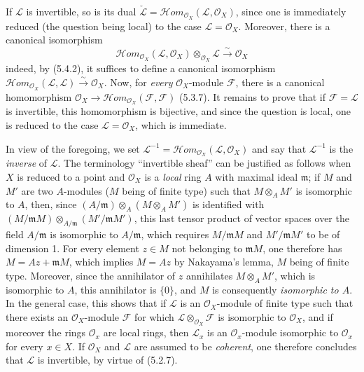\begin{env}[5.4.3]\label{0.5.4.3}
If $\mathcal{L}$ is invertible, so is its dual
$\check{\mathcal{L}}=
\mathcal{H}\!om_{\mathcal{O}_X}(\mathcal{L},\mathcal{O}_X)$, since one is
immediately reduced (the question being local) to the case $\mathcal{L}=\mathcal{O}_X$.
Moreover, there is a canonical isomorphism
\[
  \mathcal{H}\!om_{\mathcal{O}_X}(\mathcal{L},\mathcal{O}_X)
  \otimes_{\mathcal{O}_X}\mathcal{L}
  \xrightarrow{\sim}
  \mathcal{O}_X
  \tag{5.4.3.1}\label{0.5.4.3.1}
\]
indeed, by (5.4.2), it suffices to define a canonical isomorphism
$\mathcal{H}\!om_{\mathcal{O}_X}(\mathcal{L},\mathcal{L})
\xrightarrow{\sim}\mathcal{O}_X$. Now, for \emph{every}
$\mathcal{O}_X$-module $\mathcal{F}$, there is a canonical homomorphism
$\mathcal{O}_X\longrightarrow
\mathcal{H}\!om_{\mathcal{O}_X}(\mathcal{F},\mathcal{F})$ (5.3.7). It remains
to prove that if $\mathcal{F}=\mathcal{L}$ is invertible, this homomorphism
is bijective, and since the question is local, one is reduced to the case
$\mathcal{L}=\mathcal{O}_X$, which is immediate.

In view of the foregoing, we set
$\mathcal{L}^{-1}=
\mathcal{H}\!om_{\mathcal{O}_X}(\mathcal{L},\mathcal{O}_X)$ and say that
$\mathcal{L}^{-1}$ is the \emph{inverse} of $\mathcal{L}$. The terminology
``invertible sheaf'' can be justified as follows when $X$ is
reduced to a point and $\mathcal{O}_X$ is a \emph{local} ring $A$ with
maximal ideal $\mathfrak m$; if $M$ and $M'$ are two $A$-modules ($M$ being of
finite type) such that $M\otimes_A M'$ is isomorphic to $A$, then, since
$(A/\mathfrak m)\otimes_A(M\otimes_A M')$ is identified with
$(M/\mathfrak mM)\otimes_{A/\mathfrak m}(M'/\mathfrak mM')$, this last
tensor product of vector spaces over the field $A/\mathfrak m$ is
isomorphic to $A/\mathfrak m$, which requires $M/\mathfrak mM$ and
$M'/\mathfrak mM'$ to be of dimension 1. For every element $z\in M$
not belonging to $\mathfrak mM$, one therefore has $M=Az+\mathfrak mM$, which
implies $M=Az$ by Nakayama's lemma, $M$ being of finite type.
Moreover, since the annihilator of $z$ annihilates $M\otimes_A M'$, which is isomorphic to
$A$, this annihilator is $\{0\}$, and $M$ is consequently \emph{isomorphic to $A$}.
In the general case, this shows that if $\mathcal{L}$ is an
$\mathcal{O}_X$-module of finite type such that there exists an
$\mathcal{O}_X$-module $\mathcal{F}$ for which
$\mathcal{L}\otimes_{\mathcal{O}_X}\mathcal{F}$ is isomorphic to
$\mathcal{O}_X$, and if moreover the rings $\mathcal{O}_x$ are local
rings, then $\mathcal{L}_x$ is an $\mathcal{O}_x$-module isomorphic to
$\mathcal{O}_x$ for every $x\in X$. If $\mathcal{O}_X$ and $\mathcal{L}$ are
assumed to be \emph{coherent}, one therefore concludes that $\mathcal{L}$ is invertible,
by virtue of (5.2.7).
\end{env}

